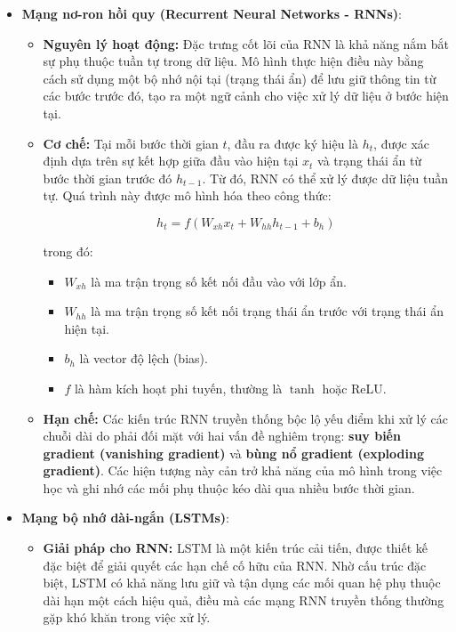 \begin{itemize}
    \item \textbf{Mạng nơ-ron hồi quy (Recurrent Neural Networks - RNNs)}\cite{SHERSTINSKY2020132306}:
    \begin{itemize}
        \item \textbf{Nguyên lý hoạt động:} Đặc trưng cốt lõi của RNN là khả năng nắm bắt sự phụ thuộc tuần tự trong dữ liệu. Mô hình thực hiện điều này bằng cách sử dụng một bộ nhớ nội tại (trạng thái ẩn) để lưu giữ thông tin từ các bước trước đó, tạo ra một ngữ cảnh cho việc xử lý dữ liệu ở bước hiện tại. 
        \item \textbf{Cơ chế:} Tại mỗi bước thời gian $t$, đầu ra được ký hiệu là $h_t$, được xác định dựa trên sự kết hợp giữa đầu vào hiện tại $x_t$ và trạng thái ẩn từ bước thời gian trước đó $h_{t-1}$. Từ đó, RNN có thể xử lý được dữ liệu tuần tự. Quá trình này được mô hình hóa theo công thức:

\[
h_t = f(W_{xh}x_t + W_{hh}h_{t-1} + b_h)
\]

trong đó:
\begin{itemize}
    \item $W_{xh}$ là ma trận trọng số kết nối đầu vào với lớp ẩn.
    \item $W_{hh}$ là ma trận trọng số kết nối trạng thái ẩn trước với trạng thái ẩn hiện tại.
    \item $b_h$ là vector độ lệch (bias).
    \item $f$ là hàm kích hoạt phi tuyến, thường là $\tanh$ hoặc ReLU.
\end{itemize}
        \item \textbf{Hạn chế:} Các kiến trúc RNN truyền thống bộc lộ yếu điểm khi xử lý các chuỗi dài do phải đối mặt với hai vấn đề nghiêm trọng: \textbf{suy biến gradient (vanishing gradient)} và \textbf{bùng nổ gradient (exploding gradient)}. Các hiện tượng này cản trở khả năng của mô hình trong việc học và ghi nhớ các mối phụ thuộc kéo dài qua nhiều bước thời gian. 

    \end{itemize}

    \item \textbf{Mạng bộ nhớ dài-ngắn (LSTMs)}\cite{10.1162/neco_a_01199}:
    \begin{itemize}
        \item \textbf{Giải pháp cho RNN:} LSTM là một kiến trúc cải tiến, được thiết kế đặc biệt để giải quyết các hạn chế cố hữu của RNN. Nhờ cấu trúc đặc biệt, LSTM có khả năng lưu giữ và tận dụng các mối quan hệ phụ thuộc dài hạn một cách hiệu quả, điều mà các mạng RNN truyền thống thường gặp khó khăn trong việc xử lý.


\end{itemize}
\end{itemize}
